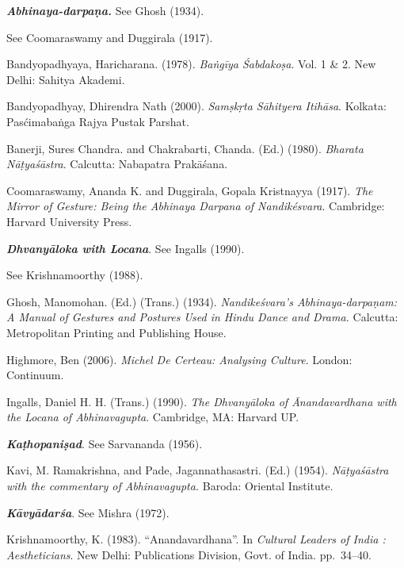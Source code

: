 \begin{thebibliography}{99}
\itemsep=2pt
{\sl\bfseries Abhinaya-darpaṇa.} See Ghosh (1934).

\hspace{2.2cm} See Coomaraswamy and Duggirala (1917).

Bandyopadhyaya, Haricharana. (1978). \textsl{Baṅgīya Śabdakoṣa}. Vol. 1 \& 2. New Delhi: Sahitya Akademi. 

Bandyopadhyay, Dhirendra Nath (2000). \textsl{Samṣkṛta Sāhityera Itihāsa}. Kolkata: Pasćimabaṅga Rajya Pustak Parshat. 

Banerji, Sures Chandra. and Chakrabarti, Chanda. (Ed.) (1980). \textsl{Bharata Nāṭyaśāstra}. Calcutta: Nabapatra Prakāśana.

Coomaraswamy, Ananda K. and Duggirala, Gopala Kristnayya (1917). \textsl{The Mirror of Gesture: Being the Abhinaya Darpana of Nandikésvara}. Cambridge: Harvard University Press. 

{\sl\bfseries Dhvanyāloka with Locana}. See Ingalls (1990).

\hspace{3.2cm} See Krishnamoorthy (1988).

Ghosh, Manomohan. (Ed.) (Trans.) (1934). \textsl{Nandikeśvara's Abhinaya-darpaṇam: A Manual of Gestures and Postures Used in Hindu Dance and Drama.} Calcutta: Metropolitan Printing and Publishing House. 

Highmore, Ben (2006). \textsl{Michel De Certeau: Analysing Culture}. London: Continuum.

Ingalls, Daniel H. H. (Trans.) (1990). \textsl{The Dhvanyāloka of Ānandavardhana with the Locana of Abhinavagupta}. Cambridge, MA: Harvard UP.

{\sl\bfseries Kaṭhopaniṣad}. See Sarvananda (1956).

Kavi, M. Ramakrishna, and Pade, Jagannathasastri. (Ed.) (1954). \textsl{Nāṭyaśāstra with the commentary of Abhinavagupta.} Baroda: Oriental Institute. 

{\sl\bfseries Kāvyādarśa}. See Mishra (1972).

Krishnamoorthy, K. (1983). “Anandavardhana”. In {\sl Cultural Leaders of India : Aestheticians}. New Delhi: Publications Division, Govt. of India. pp.~34--40.


\end{thebibliography}
